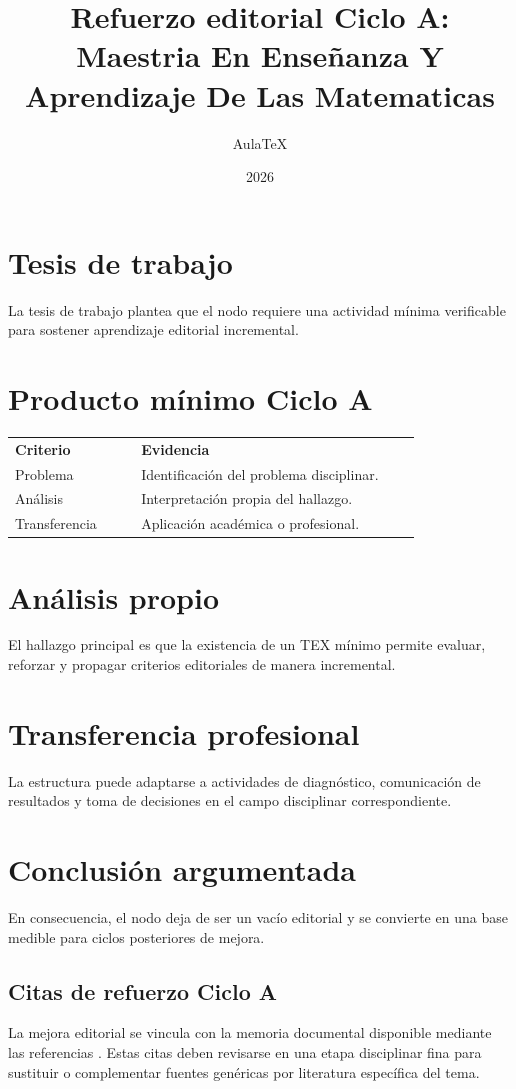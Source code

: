 \documentclass[12pt]{article}
\title{Refuerzo editorial Ciclo A: Maestria En Enseñanza Y Aprendizaje De Las Matematicas}
\author{AulaTeX}
\date{2026}
\begin{document}
\maketitle
\section*{Tesis de trabajo}
La tesis de trabajo plantea que el nodo requiere una actividad mínima verificable para sostener aprendizaje editorial incremental.
\section*{Producto mínimo Ciclo A}
\begin{center}
\begin{tabular}{p{0.28\linewidth}p{0.62\linewidth}}
\textbf{Criterio} & \textbf{Evidencia}\\
Problema & Identificación del problema disciplinar.\\
Análisis & Interpretación propia del hallazgo.\\
Transferencia & Aplicación académica o profesional.\\
\end{tabular}
\end{center}
\section*{Análisis propio}
El hallazgo principal es que la existencia de un TEX mínimo permite evaluar, reforzar y propagar criterios editoriales de manera incremental.
\section*{Transferencia profesional}
La estructura puede adaptarse a actividades de diagnóstico, comunicación de resultados y toma de decisiones en el campo disciplinar correspondiente.
\section*{Conclusión argumentada}
En consecuencia, el nodo deja de ser un vacío editorial y se convierte en una base medible para ciclos posteriores de mejora.



\subsection*{Citas de refuerzo Ciclo A}
La mejora editorial se vincula con la memoria documental disponible mediante las referencias \citep{cicloARefuerzo01,cicloARefuerzo02,cicloARefuerzo03,cicloARefuerzo04,cicloARefuerzo05,cicloARefuerzo06}. Estas citas deben revisarse en una etapa disciplinar fina para sustituir o complementar fuentes genéricas por literatura específica del tema.
\end{document}
